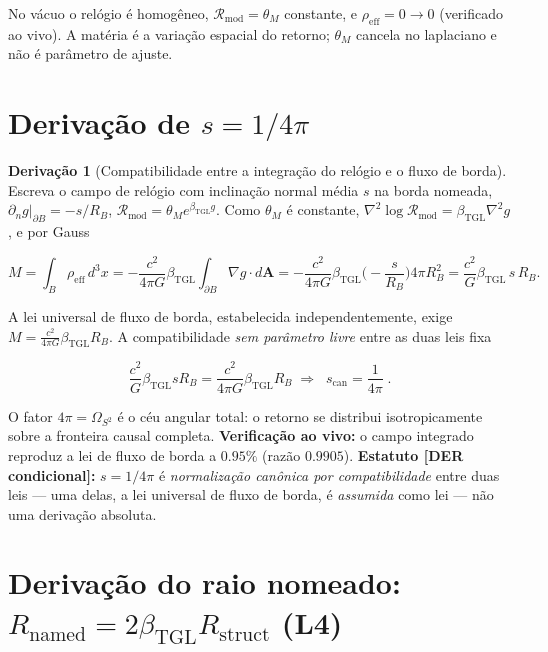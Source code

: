 \documentclass[11pt]{article}
\newcommand{\bTGL}{\beta_{\mathrm{TGL}}}\newcommand{\Msun}{M_{\odot}}\newcommand{\TGL}{\mathrm{TGL}}
\theoremstyle{definition}\newtheorem{deriv}{Derivação}
\begin{document}
No vácuo o relógio é homogêneo, $\mathcal{R}_{\mathrm{mod}}=\theta_M$ constante, e $\rho_{\mathrm{eff}}=0\to 0$ (verificado ao vivo). A matéria é a variação espacial do retorno; $\theta_M$ cancela no laplaciano e não é parâmetro de ajuste.

\section{Derivação de $s=1/4\pi$}

\begin{deriv}[Compatibilidade entre a integração do relógio e o fluxo de borda]

Escreva o campo de relógio com inclinação normal média $s$ na borda nomeada, $\partial_n g|_{\partial B}=-s/R_B$, $\mathcal{R}_{\mathrm{mod}}=\theta_M e^{\bTGL g}$. Como $\theta_M$ é constante, $\nabla^2\log\mathcal{R}_{\mathrm{mod}}=\bTGL\nabla^2 g$, e por Gauss

\begin{equation}M=\int_B\rho_{\mathrm{eff}}\,d^3x=-\frac{c^2}{4\pi G}\bTGL\!\int_{\partial B}\!\nabla g\cdot d\mathbf{A}=-\frac{c^2}{4\pi G}\bTGL\Big(\!-\frac{s}{R_B}\Big)4\pi R_B^2=\frac{c^2}{G}\bTGL\,s\,R_B.\end{equation}

A lei universal de fluxo de borda, estabelecida independentemente, exige $M=\frac{c^2}{4\pi G}\bTGL R_B$. A compatibilidade \emph{sem parâmetro livre} entre as duas leis fixa

\begin{equation}\frac{c^2}{G}\bTGL s R_B=\frac{c^2}{4\pi G}\bTGL R_B\;\Longrightarrow\;\boxed{\;s_{\mathrm{can}}=\frac{1}{4\pi}\;}.\end{equation}

O fator $4\pi=\Omega_{S^2}$ é o céu angular total: o retorno se distribui isotropicamente sobre a fronteira causal completa. \textbf{Verificação ao vivo:} o campo integrado reproduz a lei de fluxo de borda a $0.95\%$ (razão $0.9905$). \textbf{Estatuto \textsf{[DER condicional]}:} $s=1/4\pi$ é \emph{normalização canônica por compatibilidade} entre duas leis --- uma delas, a lei universal de fluxo de borda, é \emph{assumida} como lei --- não uma derivação absoluta.\end{deriv}

\section{Derivação do raio nomeado: $R_{\mathrm{named}}=2\bTGL R_{\mathrm{struct}}$ (L4)}
\end{document}

